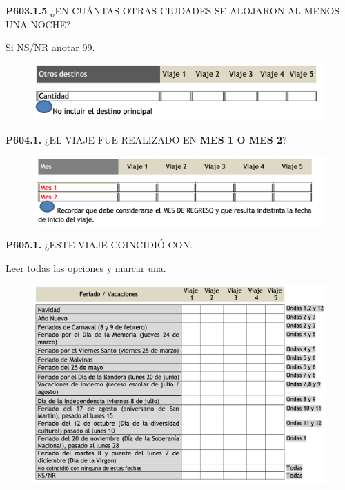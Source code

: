 \documentclass[
  openany]{book}
\begin{document}
\textbf{P603.1.5} ¿EN CUÁNTAS OTRAS CIUDADES SE ALOJARON AL MENOS UNA NOCHE?

Si NS/NR anotar 99.

\begin{figure}

{\centering \includegraphics[width=1\linewidth]{imagenes/figura6-210} 

}

\end{figure}

\textbf{P604.1.} ¿EL VIAJE FUE REALIZADO EN \textbf{MES 1 O MES 2}?

\begin{figure}

{\centering \includegraphics[width=1\linewidth]{imagenes/figura6-211} 

}

\end{figure}

\textbf{P605.1.} ¿ESTE VIAJE COINCIDIÓ CON\ldots{}

Leer todas las opciones y marcar una.

\begin{figure}

{\centering \includegraphics[width=1\linewidth]{imagenes/figura6-212} 

}

\end{figure}
\end{document}
